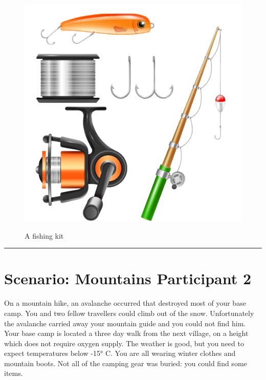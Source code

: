 \documentclass{article}
\begin{document}
    \begin{figure}[H]
        \centering
        \begin{minipage}{0.25\textwidth}
            \centering
            \includegraphics[width=\textwidth]{../SurvivalItemImages/fishingkit}
        \end{minipage}\hfill
        \begin{minipage}{0.7\textwidth}
            \centering
            \Large A fishing kit
        \end{minipage}
    \end{figure}
    \vspace{-0.8em}
    \noindent\rule{\textwidth}{0.4pt}
            
    \clearpage
    \section*{Scenario: \textmd{Mountains} \hfill Participant \textmd{2}}
    \Large On a mountain hike, an avalanche occurred that destroyed most of your base camp. You and two fellow travellers could climb out of the snow. Unfortunately the avalanche carried away your mountain guide and you could not find him. Your base camp is located a three day walk from the next village, on a height which does not require oxygen supply. The weather is good, but you need to expect temperatures below -15° C. You are all wearing winter clothes and mountain boots. Not all of the camping gear was buried: you could find some items.\clearpage
        
\end{document}
